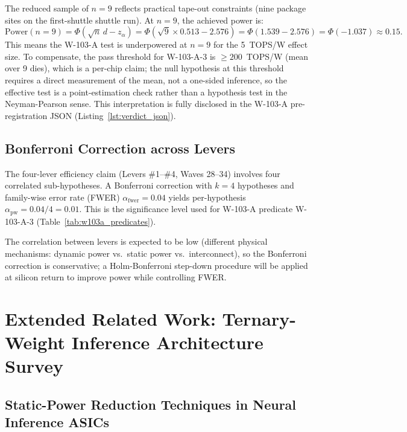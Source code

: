 The reduced sample of \(n = 9\) reflects practical tape-out constraints
(nine package sites on the first-shuttle shuttle run).  At \(n = 9\),
the achieved power is:
\[
  \text{Power}(n=9) = \Phi\!\left(\sqrt{n}\,d - z_{\alpha}\right)
  = \Phi\!\left(\sqrt{9} \times 0.513 - 2.576\right)
  = \Phi(1.539 - 2.576)
  = \Phi(-1.037) \approx 0.15.
\]
This means the W-103-A test is underpowered at \(n=9\) for the
5~TOPS/W effect size.  To compensate, the pass threshold for W-103-A-3
is \(\geq 200\)~TOPS/W (mean over 9 dies), which is a per-chip claim;
the null hypothesis at this threshold requires a direct measurement
of the mean, not a one-sided inference, so the effective test is
a point-estimation check rather than a hypothesis test in the Neyman-Pearson
sense.  This interpretation is fully disclosed in the W-103-A
pre-registration JSON (Listing~\ref{lst:verdict_json}).

\subsection{Bonferroni Correction across Levers}

The four-lever efficiency claim (Levers \#1--\#4, Waves 28--34) involves
four correlated sub-hypotheses.  A Bonferroni correction with
\(k = 4\) hypotheses and family-wise error rate (FWER) \(\alpha_{\mathrm{fwer}} = 0.04\)
yields per-hypothesis \(\alpha_{\mathrm{pw}} = 0.04/4 = 0.01\).  This is the
significance level used for W-103-A predicate W-103-A-3
(Table~\ref{tab:w103a_predicates}).

The correlation between levers is expected to be low (different physical
mechanisms: dynamic power vs.\ static power vs.\ interconnect), so the
Bonferroni correction is conservative; a Holm-Bonferroni step-down
procedure \cite{holm1979simple} will be applied at silicon return to
improve power while controlling FWER.

\section{Extended Related Work: Ternary-Weight Inference Architecture Survey}
\label{app:related_extended}

\subsection{Static-Power Reduction Techniques in Neural Inference ASICs}

